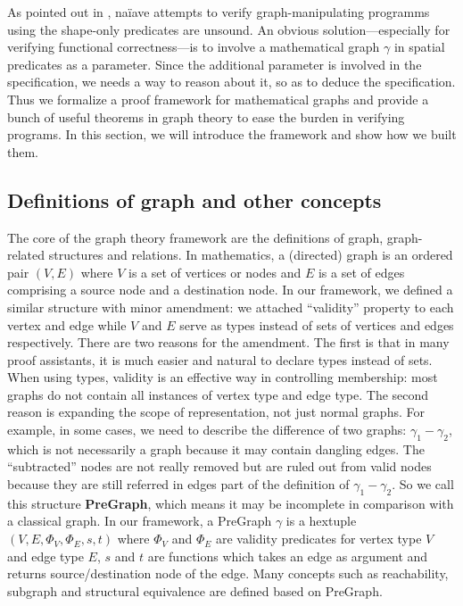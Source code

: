 As pointed out in \cite{hobor:ramification}, na\"iave attempts to
verify graph-manipulating programms using the shape-only predicates
are unsound. An obvious solution---especially for verifying functional
correctness---is to involve a mathematical graph $\gamma$ in spatial
predicates as a parameter. Since the additional parameter is involved
in the specification, we needs a way to reason about it, so as to
deduce the specification. Thus we formalize a proof framework for
mathematical graphs and provide a bunch of useful theorems in graph
theory to ease the burden in verifying programs. In this section, we
will introduce the framework and show how we built them.

\subsection{Definitions of graph and other concepts}

The core of the graph theory framework are the definitions of graph,
graph-related structures and relations. In mathematics, a (directed)
graph is an ordered pair $(V, E)$ where $V$ is a set of vertices or
nodes and $E$ is a set of edges comprising a source node and a
destination node. In our framework, we defined a similar structure
with minor amendment: we attached ``validity'' property to each vertex
and edge while $V$ and $E$ serve as types instead of sets of vertices
and edges respectively. There are two reasons for the amendment. The
first is that in many proof assistants, it is much easier and natural
to declare types instead of sets. When using types, validity is an
effective way in controlling membership: most graphs do not contain
all instances of vertex type and edge type. The second reason is
expanding the scope of representation, not just normal graphs. For
example, in some cases, we need to describe the difference of two
graphs: $\gamma_1-\gamma_2$, which is not necessarily a graph because
it may contain dangling edges. The ``subtracted'' nodes are not really
removed but are ruled out from valid nodes because they are still
referred in edges part of the definition of $\gamma_1-\gamma_2$. So we
call this structure \textbf{PreGraph}, which means it may be
incomplete in comparison with a classical graph. In our framework, a
PreGraph $\gamma$ is a hextuple $(V, E, \Phi_V, \Phi_E, s, t)$ where
$\Phi_V$ and $\Phi_E$ are validity predicates for vertex type $V$ and
edge type $E$, $s$ and $t$ are functions which takes an edge as
argument and returns source/destination node of the edge. Many
concepts such as reachability, subgraph and structural equivalence are
defined based on PreGraph.

